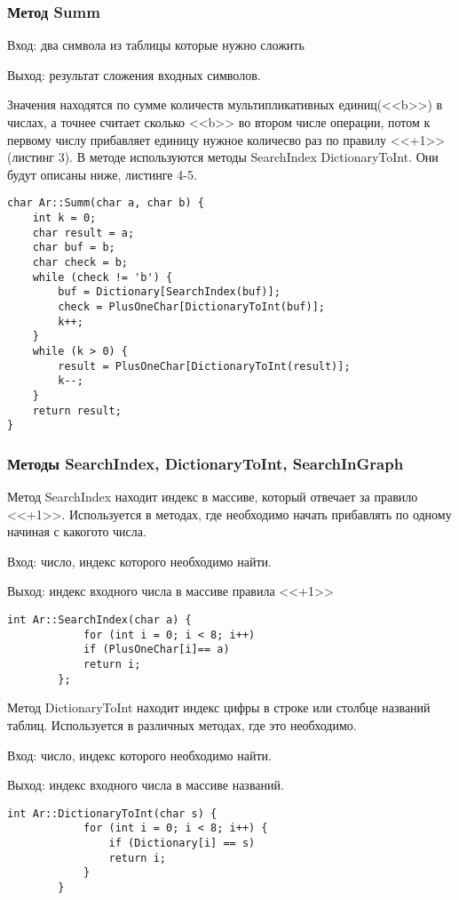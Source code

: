 \documentclass[10pt,a4paper,final]{article} %
\begin{document}
	\subsubsection{Метод Summ}
	Вход: два символа из таблицы которые нужно сложить
	
	Выход: результат сложения входных символов.
	
	Значения находятся по сумме количеств мультипликативных единиц(<<b>>) в числах, а точнее считает сколько <<b>> во втором числе операции, потом к первому числу прибавляет единицу нужное количесво раз по правилу <<+1>>(листинг 3). В методе используются методы SearchIndex DictionaryToInt. Они будут описаны ниже, листинге 4-5.
	
		\begin{lstlisting}[caption={Метод Summ}]
char Ar::Summ(char a, char b) {
	int k = 0;
	char result = a;
	char buf = b;
	char check = b;
	while (check != 'b') {
		buf = Dictionary[SearchIndex(buf)];
		check = PlusOneChar[DictionaryToInt(buf)];
		k++;
	}
	while (k > 0) {
		result = PlusOneChar[DictionaryToInt(result)];
		k--;
	}
	return result;
}
	\end{lstlisting}
	
		\subsubsection{Методы SearchIndex, DictionaryToInt, SearchInGraph}
		Метод SearchIndex находит индекс в массиве, который отвечает за правило <<+1>>. Используется в методах, где необходимо начать прибавлять по одному начиная с какогото числа.
		
	Вход: число, индекс которого необходимо найти.
	
	Выход: индекс входного числа в массиве правила <<+1>>
	
		\begin{lstlisting}[caption={Метод SearchIndex}]
		int Ar::SearchIndex(char a) {
			for (int i = 0; i < 8; i++)
			if (PlusOneChar[i]== a)
			return i;
		};
	\end{lstlisting}
	
		Метод DictionaryToInt находит индекс цифры в строке или столбце названий таблиц. Используется в различных методах, где это необходимо.
		
		Вход: число, индекс которого необходимо найти.
		
		Выход: индекс входного числа в массиве названий.
		
		
	\begin{lstlisting}[caption={Метод DictionaryToInt}]
		int Ar::DictionaryToInt(char s) {
			for (int i = 0; i < 8; i++) {
				if (Dictionary[i] == s)
				return i;
			}
		}
	\end{lstlisting}
	
\end{document}
